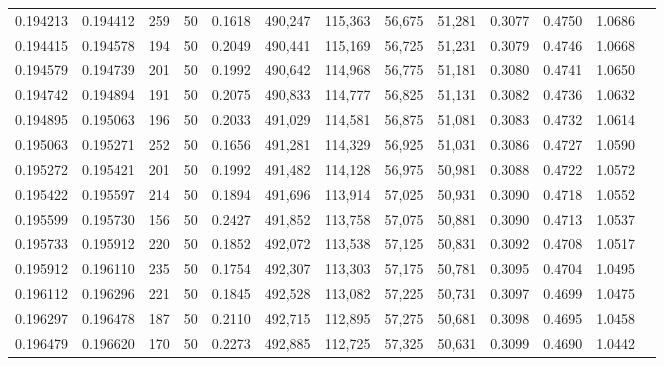 \begin{tabular}{rrrrrrrrrrrrr}
0.194213 & 0.194412 &   259 &  50 &                                     0.1618 & 490,247 & 115,363 &  56,675 &  51,281 & 0.3077 & 0.4750 & 1.0686 \\
0.194415 & 0.194578 &   194 &  50 &                                     0.2049 & 490,441 & 115,169 &  56,725 &  51,231 & 0.3079 & 0.4746 & 1.0668 \\
0.194579 & 0.194739 &   201 &  50 &                                     0.1992 & 490,642 & 114,968 &  56,775 &  51,181 & 0.3080 & 0.4741 & 1.0650 \\
0.194742 & 0.194894 &   191 &  50 &                                     0.2075 & 490,833 & 114,777 &  56,825 &  51,131 & 0.3082 & 0.4736 & 1.0632 \\
0.194895 & 0.195063 &   196 &  50 &                                     0.2033 & 491,029 & 114,581 &  56,875 &  51,081 & 0.3083 & 0.4732 & 1.0614 \\
0.195063 & 0.195271 &   252 &  50 &                                     0.1656 & 491,281 & 114,329 &  56,925 &  51,031 & 0.3086 & 0.4727 & 1.0590 \\
0.195272 & 0.195421 &   201 &  50 &                                     0.1992 & 491,482 & 114,128 &  56,975 &  50,981 & 0.3088 & 0.4722 & 1.0572 \\
0.195422 & 0.195597 &   214 &  50 &                                     0.1894 & 491,696 & 113,914 &  57,025 &  50,931 & 0.3090 & 0.4718 & 1.0552 \\
0.195599 & 0.195730 &   156 &  50 &                                     0.2427 & 491,852 & 113,758 &  57,075 &  50,881 & 0.3090 & 0.4713 & 1.0537 \\
0.195733 & 0.195912 &   220 &  50 &                                     0.1852 & 492,072 & 113,538 &  57,125 &  50,831 & 0.3092 & 0.4708 & 1.0517 \\
0.195912 & 0.196110 &   235 &  50 &                                     0.1754 & 492,307 & 113,303 &  57,175 &  50,781 & 0.3095 & 0.4704 & 1.0495 \\
0.196112 & 0.196296 &   221 &  50 &                                     0.1845 & 492,528 & 113,082 &  57,225 &  50,731 & 0.3097 & 0.4699 & 1.0475 \\
0.196297 & 0.196478 &   187 &  50 &                                     0.2110 & 492,715 & 112,895 &  57,275 &  50,681 & 0.3098 & 0.4695 & 1.0458 \\
0.196479 & 0.196620 &   170 &  50 &                                     0.2273 & 492,885 & 112,725 &  57,325 &  50,631 & 0.3099 & 0.4690 & 1.0442 \\

\end{tabular}

